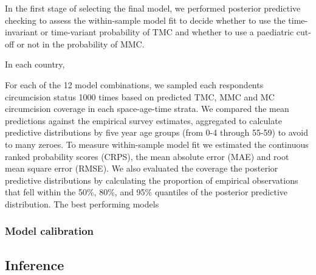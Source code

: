 \documentclass{article}
\begin{document}
\begin{appendix}

In the first stage of selecting the final model, we performed posterior predictive checking to assess the within-sample model fit to decide whether to use the time-invariant or time-variant probability of TMC and whether to use a paediatric cut-off or not in the probability of MMC. 

In each country, 



For each of the 12 model combinations, we sampled each respondents circumcision status 1000 times based on predicted TMC, MMC and MC circumcision coverage in each space-age-time strata. We compared the mean predictions against the empirical survey estimates, aggregated to calculate predictive distributions by five year age groups (from 0-4 through 55-59) to avoid to many zeroes. To measure within-sample model fit we estimated the continuous ranked probability scores (CRPS), the mean absolute error (MAE) and root mean square error (RMSE). We also evaluated the coverage the posterior predictive distributions by calculating the proportion of empirical observations that fell within the 50\%, 80\%, and 95\% quantiles of the posterior predictive distribution. The best performing models 




\subsubsection{Model calibration}












\subsection{Inference}
\label{sec::inference}



\end{appendix}
\end{document}
